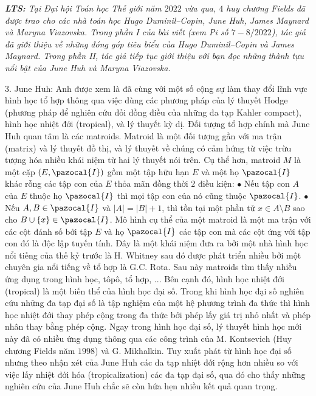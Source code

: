 \textit{\textbf{\color{duongvaotoanhoc}LTS: }Tại Đại hội Toán học Thế giới năm $2022$ vừa qua, $4$ huy chương Fields đã được trao cho các nhà toán học Hugo Duminil--Copin, June Huh, James Maynard và Maryna Viazovska. Trong phần I của bài viết (xem Pi số $7-8/2022$), tác giả đã giới thiệu về những đóng góp tiêu biểu của  Hugo Duminil--Copin và James Maynard. Trong phần II, tác giả tiếp tục giới thiệu với bạn đọc những thành tựu nổi bật của June Huh và Maryna Viazovska.}
\begin{multicols}{2}	
	$3.$ June Huh: Anh được xem là đã cùng với một số cộng sự làm thay đổi lĩnh vực hình học tổ hợp thông qua việc dùng các phương pháp của lý thuyết Hodge (phương pháp để nghiên cứu đối đồng điều của những đa tạp Kahler compact), hình học nhiệt đới (tropical), và lý thuyết kỳ dị. Đối tượng tổ hợp chính mà June Huh quan tâm là các matroids. Matroid là một đối tượng gần với ma trận (matrix) và lý thuyết đồ thị, và lý thuyết về chúng có cảm hứng từ việc trừu tượng hóa nhiều khái niệm từ hai lý thuyết nói trên. Cụ thể hơn, matroid $M$ là một cặp $(E,\pazocal{I})$ gồm một tập hữu hạn $E$ và một họ $\pazocal{I}$ khác rỗng các tập con của $E$ thỏa mãn đồng thời $2$ điều kiện:
	\vskip 0.05cm
	$\bullet$ Nếu tập con $A$ của $E$ thuộc họ $\pazocal{I}$ thì mọi tập con của nó cũng thuộc $\pazocal{I}$.
	\vskip 0.05cm
	$\bullet$ Nếu $A, B \in \pazocal{I}$ và $|A| = |B| +1$, thì tồn tại một phần tử $x \in A \setminus B$ sao cho $B \cup \{x\} \in \pazocal{I}$.
	\vskip 0.05cm
	Mô hình cụ thể của một matroid là một ma trận với các cột đánh số bởi tập $E$ và họ $\pazocal{I}$ các tập con mà các cột ứng với tập con đó là độc lập tuyến tính.
	\vskip 0.05cm
	Đây là một khái niệm đưa ra bởi một nhà hình học nổi tiếng của thế kỷ trước là H. Whitney sau đó được phát triển nhiều bởi một chuyên gia nổi tiếng về tổ hợp là G.C. Rota. Sau này matroids tìm thấy nhiều ứng dụng trong hình học, tôpô, tổ hợp, ...
	\vskip 0.05cm
	Bên cạnh đó, hình học nhiệt đới (tropical) là một biến thể của hình học đại số. Trong khi hình học đại số nghiên cứu những đa tạp đại số là tập nghiệm của một hệ phương trình đa thức thì hình học nhiệt đới thay phép cộng trong đa thức bởi phép lấy giá trị nhỏ nhất và phép nhân thay bằng phép cộng. Ngay trong hình học đại số, lý thuyết hình học mới này đã có nhiều ứng dụng thông qua các công trình của M. Kontsevich (Huy chương Fields năm $1998$) và G. Mikhalkin. Tuy xuất phát từ hình học đại số nhưng theo nhận xét của June Huh các đa tạp nhiệt đới rộng hơn nhiều so với việc lấy nhiệt đới hóa (tropicalization) các đa tạp đại số, qua đó cho thấy những nghiên cứu của June Huh chắc sẽ còn hứa hẹn nhiều kết quả quan trọng.  

\end{multicols}
